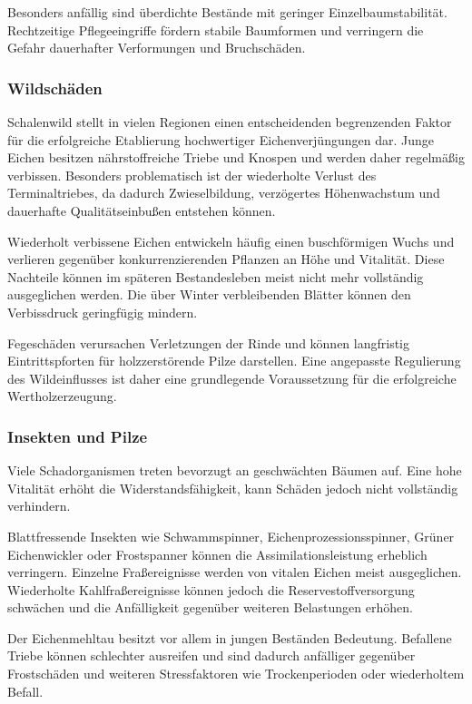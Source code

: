\documentclass[twocolumn, bibliography=totoc, abstract=true]{scrartcl}
\begin{document}
Besonders anfällig sind überdichte Bestände mit geringer Einzelbaumstabilität. Rechtzeitige Pflegeeingriffe fördern stabile Baumformen und verringern die Gefahr dauerhafter Verformungen und Bruchschäden.

\subsubsection{Wildschäden}

Schalenwild stellt in vielen Regionen einen entscheidenden begrenzenden Faktor für die erfolgreiche Etablierung hochwertiger Eichenverjüngungen dar. Junge Eichen besitzen nährstoffreiche Triebe und Knospen und werden daher regelmäßig verbissen. Besonders problematisch ist der wiederholte Verlust des Terminaltriebes, da dadurch Zwieselbildung, verzögertes Höhenwachstum und dauerhafte Qualitätseinbußen entstehen können.

Wiederholt verbissene Eichen entwickeln häufig einen buschförmigen Wuchs und verlieren gegenüber konkurrenzierenden Pflanzen an Höhe und Vitalität. Diese Nachteile können im späteren Bestandesleben meist nicht mehr vollständig ausgeglichen werden. Die über Winter verbleibenden Blätter können den Verbissdruck geringfügig mindern.

Fegeschäden verursachen Verletzungen der Rinde und können langfristig Eintrittspforten für holzzerstörende Pilze darstellen. Eine angepasste Regulierung des Wildeinflusses ist daher eine grundlegende Voraussetzung für die erfolgreiche Wertholzerzeugung.

\subsubsection{Insekten und Pilze}

Viele Schadorganismen treten bevorzugt an geschwächten Bäumen auf. Eine hohe Vitalität erhöht die Widerstandsfähigkeit, kann Schäden jedoch nicht vollständig verhindern.

Blattfressende Insekten wie Schwammspinner, Eichenprozessionsspinner, Grüner Eichenwickler oder Frostspanner können die Assimilationsleistung erheblich verringern. Einzelne Fraßereignisse werden von vitalen Eichen meist ausgeglichen. Wiederholte Kahlfraßereignisse können jedoch die Reservestoffversorgung schwächen und die Anfälligkeit gegenüber weiteren Belastungen erhöhen.

Der Eichenmehltau besitzt vor allem in jungen Beständen Bedeutung. Befallene Triebe können schlechter ausreifen und sind dadurch anfälliger gegenüber Frostschäden und weiteren Stressfaktoren wie Trockenperioden oder wiederholtem Befall.
\end{document}
